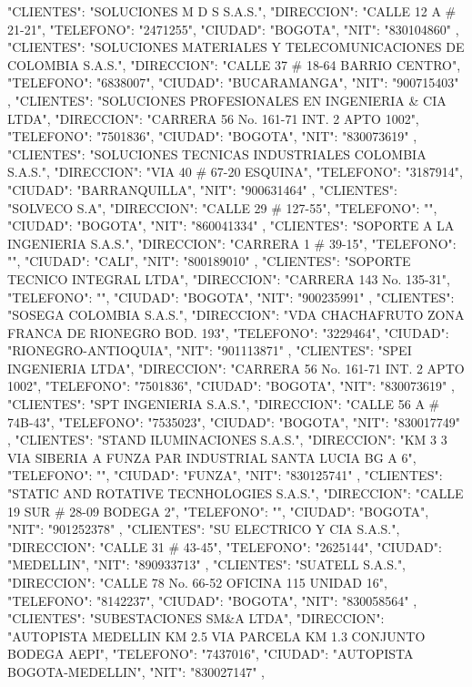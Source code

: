    {
   "CLIENTES": "SOLUCIONES M D S S.A.S.",
   "DIRECCION": "CALLE 12 A # 21-21",
   "TELEFONO": "2471255",
   "CIUDAD": "BOGOTA",
   "NIT": "830104860"
   },
   {
   "CLIENTES": "SOLUCIONES MATERIALES Y TELECOMUNICACIONES DE COLOMBIA S.A.S.",
   "DIRECCION": "CALLE 37 # 18-64 BARRIO CENTRO",
   "TELEFONO": "6838007",
   "CIUDAD": "BUCARAMANGA",
   "NIT": "900715403"
   },
   {
   "CLIENTES": "SOLUCIONES PROFESIONALES EN INGENIERIA & CIA LTDA",
   "DIRECCION": "CARRERA 56 No. 161-71 INT. 2 APTO 1002",
   "TELEFONO": "7501836",
   "CIUDAD": "BOGOTA",
   "NIT": "830073619"
   },
   {
   "CLIENTES": "SOLUCIONES TECNICAS INDUSTRIALES COLOMBIA S.A.S.",
   "DIRECCION": "VIA 40 # 67-20 ESQUINA",
   "TELEFONO": "3187914",
   "CIUDAD": "BARRANQUILLA",
   "NIT": "900631464"
   },
   {
   "CLIENTES": "SOLVECO S.A",
   "DIRECCION": "CALLE 29 # 127-55",
   "TELEFONO": "",
   "CIUDAD": "BOGOTA",
   "NIT": "860041334"
   },
   {
   "CLIENTES": "SOPORTE A LA INGENIERIA S.A.S.",
   "DIRECCION": "CARRERA 1 # 39-15",
   "TELEFONO": "",
   "CIUDAD": "CALI",
   "NIT": "800189010"
   },
   {
   "CLIENTES": "SOPORTE TECNICO INTEGRAL LTDA",
   "DIRECCION": "CARRERA 143 No. 135-31",
   "TELEFONO": "",
   "CIUDAD": "BOGOTA",
   "NIT": "900235991"
   },
   {
   "CLIENTES": "SOSEGA COLOMBIA S.A.S.",
   "DIRECCION": "VDA CHACHAFRUTO ZONA FRANCA DE RIONEGRO BOD. 193",
   "TELEFONO": "3229464",
   "CIUDAD": "RIONEGRO-ANTIOQUIA",
   "NIT": "901113871"
   },
   {
   "CLIENTES": "SPEI INGENIERIA LTDA",
   "DIRECCION": "CARRERA 56 No. 161-71 INT. 2 APTO 1002",
   "TELEFONO": "7501836",
   "CIUDAD": "BOGOTA",
   "NIT": "830073619"
   },
   {
   "CLIENTES": "SPT INGENIERIA S.A.S.",
   "DIRECCION": "CALLE 56 A # 74B-43",
   "TELEFONO": "7535023",
   "CIUDAD": "BOGOTA",
   "NIT": "830017749"
   },
   {
   "CLIENTES": "STAND ILUMINACIONES S.A.S.",
   "DIRECCION": "KM 3 3 VIA SIBERIA A FUNZA PAR INDUSTRIAL SANTA LUCIA BG A 6",
   "TELEFONO": "",
   "CIUDAD": "FUNZA",
   "NIT": "830125741"
   },
   {
   "CLIENTES": "STATIC AND ROTATIVE TECNHOLOGIES S.A.S.",
   "DIRECCION": "CALLE 19 SUR # 28-09 BODEGA 2",
   "TELEFONO": "",
   "CIUDAD": "BOGOTA",
   "NIT": "901252378"
   },
   {
   "CLIENTES": "SU ELECTRICO Y CIA S.A.S.",
   "DIRECCION": "CALLE 31 # 43-45",
   "TELEFONO": "2625144",
   "CIUDAD": "MEDELLIN",
   "NIT": "890933713"
   },
   {
   "CLIENTES": "SUATELL S.A.S.",
   "DIRECCION": "CALLE 78 No. 66-52 OFICINA 115 UNIDAD 16",
   "TELEFONO": "8142237",
   "CIUDAD": "BOGOTA",
   "NIT": "830058564"
   },
   {
   "CLIENTES": "SUBESTACIONES SM&A LTDA",
   "DIRECCION": "AUTOPISTA MEDELLIN KM 2.5 VIA PARCELA KM 1.3 CONJUNTO BODEGA AEPI",
   "TELEFONO": "7437016",
   "CIUDAD": "AUTOPISTA BOGOTA-MEDELLIN",
   "NIT": "830027147"
   },
